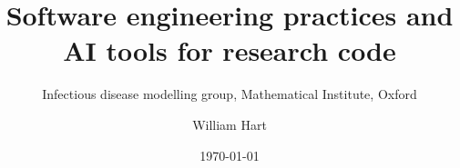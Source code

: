 \documentclass[aspectratio=169,11pt]{beamer}
\title{Software engineering practices and AI tools for research code}
\subtitle{Infectious disease modelling group, Mathematical Institute, Oxford}
\author{William Hart}
\date{\today}
\begin{document}
\begin{frame}
  \titlepage
\end{frame}
\end{document}
